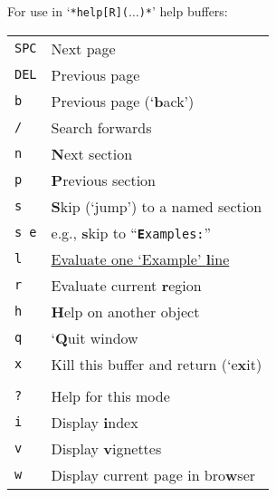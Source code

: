 \documentclass[a4paper]{article}
\newenvironment{tabI}{\begin{tabular}{p{16mm}l}}{\end{tabular}}
\begin{document}
\begin{multicols}{2}
For use in `\texttt{*help[R]($\ldots$)*}' help buffers:

\begin{tabI}
  \texttt{SPC} & Next page \\
  \texttt{DEL} & Previous page \\
  \texttt{b}   & Previous page (`\textbf{b}ack')\\
  \texttt{/}   & Search forwards \\
  \texttt{n}   & \textbf{N}ext section \\
  \texttt{p}   & \textbf{P}revious section \\
  \texttt{s}   & \textbf{S}kip (`jump') to a named section \\
  \texttt{s e} & e.g., \textbf{s}kip to ``\texttt{\textbf{E}xamples:}'' \\
  \texttt{l}   & \underline{Evaluate one `Example' \textbf{l}ine} \\
  \texttt{r}   & Evaluate current \textbf{r}egion \\
  \texttt{h}   &\textbf{H}elp on another object \\
  \texttt{q}   & `\textbf{Q}uit window \\
  \texttt{x}   & Kill this buffer and return (`e\textbf{x}it) \\
  \\
  \texttt{?}   & Help for this mode \\
  \texttt{i}   & Display \textbf{i}ndex\\
  \texttt{v}   & Display \textbf{v}ignettes\\
  \texttt{w}   & Display current page in bro\textbf{w}ser\\
\end{tabI}

\end{multicols}

\pagebreak
\end{document}
